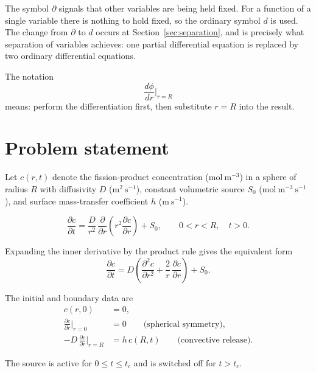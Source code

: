 \documentclass[11pt,a4paper]{article}
\begin{document}
\medskip
\noindent
The symbol $\partial$ signals that other variables are being held fixed. For a
function of a single variable there is nothing to hold fixed, so the ordinary
symbol $d$ is used. The change from $\partial$ to $d$ occurs at
Section~\ref{sec:separation}, and is precisely what separation of variables
achieves: one partial differential equation is replaced by two ordinary
differential equations.

\medskip
\noindent
The notation
\begin{equation*}
\frac{d\phi}{dr}\bigg|_{r=R}
\end{equation*}
means: perform the differentiation first, then substitute $r=R$ into the result.

\section{Problem statement}

Let $c(r,t)$ denote the fission-product concentration
($\mathrm{mol\ m^{-3}}$) in a sphere of radius $R$ with diffusivity $D$
($\mathrm{m^{2}\ s^{-1}}$), constant volumetric source $S_{0}$
($\mathrm{mol\ m^{-3}\ s^{-1}}$), and surface mass-transfer coefficient $h$
($\mathrm{m\ s^{-1}}$).

\begin{equation}
\frac{\partial c}{\partial t}
= \frac{D}{r^{2}}\,\frac{\partial}{\partial r}\!\left(r^{2}\frac{\partial c}{\partial r}\right) + S_{0},
\qquad 0 < r < R,\quad t > 0 .
\label{eq:pde}
\end{equation}

Expanding the inner derivative by the product rule gives the equivalent form
\begin{equation}
\frac{\partial c}{\partial t}
= D\left(\frac{\partial^{2} c}{\partial r^{2}} + \frac{2}{r}\,\frac{\partial c}{\partial r}\right) + S_{0} .
\label{eq:pde-expanded}
\end{equation}

The initial and boundary data are
\begin{align}
c(r,0) &= 0 , \label{eq:ic}\\[0.3em]
\frac{\partial c}{\partial r}\bigg|_{r=0} &= 0
\qquad \text{(spherical symmetry)} , \label{eq:bc0}\\[0.3em]
-D\,\frac{\partial c}{\partial r}\bigg|_{r=R} &= h\,c(R,t)
\qquad \text{(convective release)} . \label{eq:bcR}
\end{align}

The source is active for $0 \le t \le t_{c}$ and is switched off for $t > t_{c}$.
\end{document}
